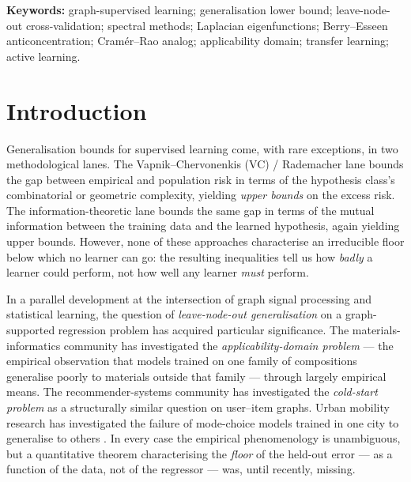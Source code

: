 \documentclass[11pt,a4paper]{article}
\theoremstyle{plain}
\theoremstyle{definition}
\theoremstyle{remark}
\begin{document}
\noindent\textbf{Keywords:} graph-supervised learning; generalisation
lower bound; leave-node-out cross-validation; spectral methods; Laplacian
eigenfunctions; Berry--Esseen anticoncentration; Cram\'er--Rao analog;
applicability domain; transfer learning; active learning.

\section{Introduction}
\label{sec:intro}

Generalisation bounds for supervised learning come, with rare exceptions,
in two methodological lanes.  The Vapnik--Chervonenkis (VC) / Rademacher
lane \citep{Vapnik1998,Mohri2018book,Tripuraneni2020} bounds the gap
between empirical and population risk in terms of the hypothesis class's
combinatorial or geometric complexity, yielding \emph{upper bounds} on
the excess risk.  The information-theoretic lane
\citep{Russo2016,Xu2017,Tran2019,Nguyen2023} bounds the same gap in terms
of the mutual information between the training data and the learned
hypothesis, again yielding upper bounds.  However, none of these
approaches characterise an irreducible floor below which no learner can
go: the resulting inequalities tell us how \emph{badly} a learner could
perform, not how well any learner \emph{must} perform.

In a parallel development at the intersection of graph signal processing
\citep{Shuman2013,Ortega2018} and statistical learning, the question of
\emph{leave-node-out generalisation} on a graph-supported regression
problem has acquired particular significance.  The materials-informatics
community has investigated the \emph{applicability-domain problem}
\citep{Tropsha2010,Sahigara2012,Hanser2016} --- the empirical observation
that models trained on one family of compositions generalise poorly to
materials outside that family --- through largely empirical means.  The
recommender-systems community has investigated the \emph{cold-start
problem} \citep{Schein2002,Marlin2003,Kluver2014} as a structurally
similar question on user--item graphs.  Urban mobility research has
investigated the failure of mode-choice models trained in one city to
generalise to others \citep{Naik2014,Hillel2021}.  In every case the
empirical phenomenology is unambiguous, but a quantitative theorem
characterising the \emph{floor} of the held-out error --- as a function
of the data, not of the regressor --- was, until recently, missing.
\end{document}
